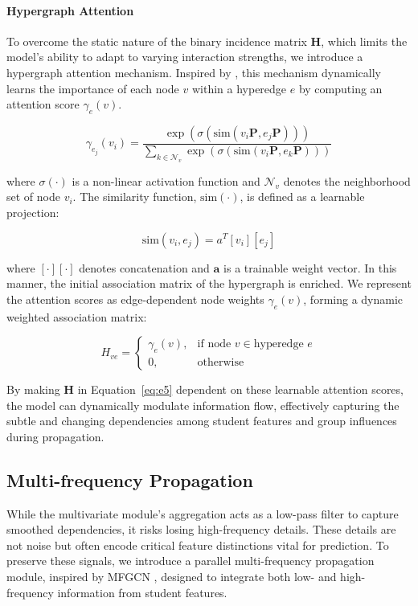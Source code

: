 \documentclass[runningheads]{llncs}
\begin{document}
\paragraph{\textbf{Hypergraph Attention}}

To overcome the static nature of the binary incidence matrix $\mathbf{H}$, which limits the model's ability to adapt to varying interaction strengths, we introduce a hypergraph attention mechanism. Inspired by \cite{bai2021hypergraph}, this mechanism dynamically learns the importance of each node $v$ within a hyperedge $e$ by computing an attention score $\gamma_e(v)$.

\begin{equation}\label{eq:e7}
	\gamma_{e_j}(v_i) = \frac{\exp(\sigma(\text{sim}(v_i \mathbf{P}, e_j \mathbf{P})))}{\sum_{k \in \mathcal{N}_v} \exp(\sigma(\text{sim}(v_i \mathbf{P}, e_k \mathbf{P})))}
\end{equation}

\noindent where $\sigma(\cdot)$ is a non-linear activation function and $\mathcal{N}_v$ denotes the neighborhood set of node $v_i$. The similarity function, $\text{sim}(\cdot)$, is defined as a learnable projection:


\begin{equation}\label{eq:e8}
	\text{sim}(v_i,e_j) = a^T[v_i][e_j]
\end{equation}

\noindent where $[\cdot][\cdot]$ denotes concatenation and $\mathbf{a}$ is a trainable weight vector. In this manner, the initial association matrix of the hypergraph is enriched. We represent the attention scores as edge-dependent node weights $\gamma_e(v)$, forming a dynamic weighted association matrix:

\begin{equation}\label{eq:e9}
	H_{ve} = 
	\begin{cases}
		\gamma_e(v), & \text{if node } v \in \text{hyperedge } e \\
		0, & \text{otherwise}
	\end{cases}
\end{equation}

\noindent By making $\mathbf{H}$ in Equation~\ref{eq:e5} dependent on these learnable attention scores, the model can dynamically modulate information flow, effectively capturing the subtle and changing dependencies among student features and group influences during propagation.



\subsection{Multi-frequency Propagation}{\label{Multi-frequency propagation}}
While the multivariate module's aggregation acts as a low-pass filter to capture smoothed dependencies, it risks losing high-frequency details. These details are not noise but often encode critical feature distinctions vital for prediction. To preserve these signals, we introduce a parallel multi-frequency propagation module, inspired by MFGCN \cite{bo2021beyond}, designed to integrate both low- and high-frequency information from student features.
\end{document}
